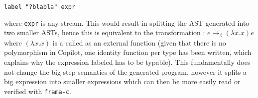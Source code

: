 \begin{lstlisting}[frame=single]
label "?blabla" expr
\end{lstlisting}

where \texttt{expr} is any stream. This would result in splitting the AST generated into two smaller ASTs, hence this is equivalent to the transformation : $ e \rightarrow_{\beta} (\lambda x . x) e $ where $(\lambda x . x)$ is a called as an external function (given that there is no polymorphism in Copilot, one identity function per type has been written, which explains why the expression labeled has to be typable). 
This fundamentally does not change the big-step semantics of the generated program, however it splits a big expression into smaller expressions which can then be more easily read or verified with \texttt{frama-c}.